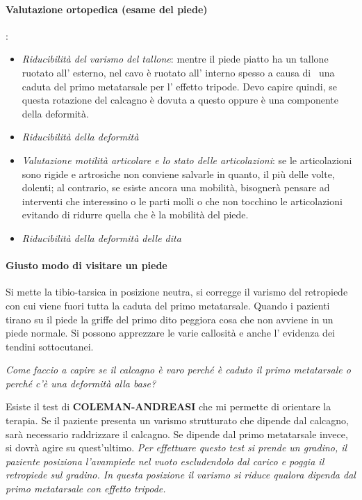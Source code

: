\paragraph{Valutazione ortopedica (esame del piede)}:

\begin{itemize}
\item
  \emph{Riducibilità del varismo del tallone}: mentre il piede piatto ha un tallone ruotato all' esterno, nel cavo è ruotato all' interno spesso a causa di ~una caduta del primo metatarsale per l' effetto tripode. Devo capire quindi, se questa rotazione del calcagno è dovuta a questo oppure è una componente della deformità.
\item
  \emph{Riducibilità della deformità}
\item
  \emph{Valutazione motilità articolare e lo stato delle articolazioni}: se le articolazioni sono rigide e artrosiche non conviene salvarle in quanto, il più delle volte, dolenti; al contrario, se esiste ancora una mobilità, bisognerà pensare ad interventi che interessino o le parti molli o che non tocchino le articolazioni evitando di ridurre quella che è la mobilità del piede.
\item
  \emph{Riducibilità della deformità delle dita}
\end{itemize}

\paragraph{Giusto modo di visitare un piede}
Si mette la tibio-tarsica in posizione neutra, si corregge il varismo del retropiede con cui viene fuori tutta la caduta del primo metatarsale. Quando i pazienti tirano su il piede la griffe del primo dito peggiora cosa che non avviene in un piede normale. Si possono apprezzare le varie callosità e anche l' evidenza dei tendini sottocutanei.

\emph{Come faccio a capire se il calcagno è varo perché è caduto il primo metatarsale o perché c'è una deformità alla base?}

Esiste il test di \textbf{COLEMAN-ANDREASI} che mi permette di orientare la terapia. Se il paziente presenta un varismo strutturato che dipende dal calcagno, sarà necessario raddrizzare il calcagno. Se dipende dal primo metatarsale invece, si dovrà agire su quest'ultimo. \emph{Per effettuare questo test si prende un gradino, il paziente posiziona l'avampiede nel vuoto escludendolo dal carico e poggia il retropiede sul gradino.
In questa posizione il varismo si riduce qualora dipenda dal primo metatarsale con effetto tripode.}

